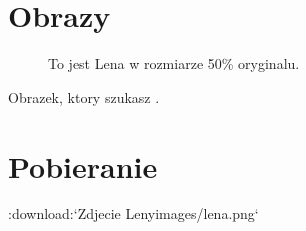 \documentclass[letterpaper,10pt,english]{sphinxmanual}
\begin{document}
\section{Obrazy}
\label{\detokenize{tutorial:obrazy}}
\begin{sphinxVerbatim}[commandchars=\\\{\}]
             
   
      
       

         
\end{sphinxVerbatim}

\begin{figure}[htbp]
\centering
\capstart

\noindent{}
\caption{To jest Lena w rozmiarze 50\% oryginalu.}\label{\detokenize{tutorial:to-lena}}\label{\detokenize{tutorial:id1}}\end{figure}

\begin{sphinxVerbatim}[commandchars=\\\{\}]
   
\end{sphinxVerbatim}

Obrazek, ktory szukasz {\hyperref[\detokenize{tutorial:to-lena}]{}}.


\section{Pobieranie}
\label{\detokenize{tutorial:pobieranie}}
\begin{sphinxVerbatim}[commandchars=\\\{\}]
:download:{}`Zdjecie Leny\PYGZlt{}images/lena.png\PYGZgt{}{}`
\end{sphinxVerbatim}
\end{document}
